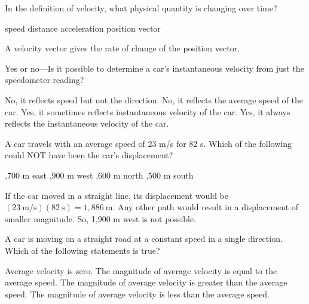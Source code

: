 \documentclass[answers]{exam}
\begin{document}
\begin{questions}
\begin{questions}
\begin{choices}
\end{choices}

\question
In the definition of velocity, what physical quantity is changing over time?

\begin{choices}
\choice speed
\choice distance
\choice acceleration
\CorrectChoice position vector
\end{choices}

\begin{solution}
A velocity vector gives the rate of change of the position vector.
\end{solution}

\question
Yes or no---Is it possible to determine a car’s instantaneous velocity from just the speedometer reading?

\begin{choices}
\CorrectChoice No, it reflects speed but not the direction.
\choice No, it reflects the average speed of the car.
\choice Yes, it sometimes reflects instantaneous velocity of the car.
\choice Yes, it always reflects the instantaneous velocity of the car.
\end{choices}

\question
A car travels with an average speed of 23 m/s for 82 s. Which of the following could NOT have been the car's displacement?

\begin{choices}
,700 m east
,900 m west
,600 m north
,500 m south
\end{choices}

\begin{solution}
If the car moved in a straight line, its displacement would be $(23\ \mathrm{m/s})(82\ \mathrm{s}) = 1,886\ \mathrm{m}$. Any other path would result in a displacement of smaller magnitude. So, 1,900 m west is not possible.
\end{solution}

\question 
A car is moving on a straight road at a constant speed in a single direction. Which of the following statements is true?

\begin{choices}
\choice Average velocity is zero.
\CorrectChoice The magnitude of average velocity is equal to the average speed.
\choice The magnitude of average velocity is greater than the average speed.
\choice The magnitude of average velocity is less than the average speed.
\end{choices}


\end{questions}
\end{questions}
\end{document}
